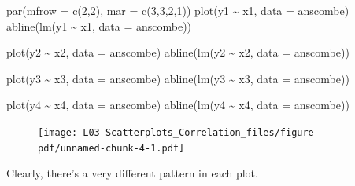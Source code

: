 \documentclass[
  letterpaper,
  DIV=11,
  numbers=noendperiod]{scrreprt}
\newenvironment{Shaded}{\begin{snugshade}}{\end{snugshade}}
\newcommand{\AttributeTok}[1]{\textcolor[rgb]{0.40,0.45,0.13}{#1}}
\newcommand{\DecValTok}[1]{\textcolor[rgb]{0.68,0.00,0.00}{#1}}
\newcommand{\FunctionTok}[1]{\textcolor[rgb]{0.28,0.35,0.67}{#1}}
\newcommand{\NormalTok}[1]{\textcolor[rgb]{0.00,0.23,0.31}{#1}}
\newcommand{\SpecialCharTok}[1]{\textcolor[rgb]{0.37,0.37,0.37}{#1}}
\begin{document}
\begin{Shaded}
\begin{Highlighting}[]
\FunctionTok{par}\NormalTok{(}\AttributeTok{mfrow =} \FunctionTok{c}\NormalTok{(}\DecValTok{2}\NormalTok{,}\DecValTok{2}\NormalTok{), }\AttributeTok{mar =} \FunctionTok{c}\NormalTok{(}\DecValTok{3}\NormalTok{,}\DecValTok{3}\NormalTok{,}\DecValTok{2}\NormalTok{,}\DecValTok{1}\NormalTok{))}
\FunctionTok{plot}\NormalTok{(y1 }\SpecialCharTok{\textasciitilde{}}\NormalTok{ x1, }\AttributeTok{data =}\NormalTok{ anscombe)}
\FunctionTok{abline}\NormalTok{(}\FunctionTok{lm}\NormalTok{(y1 }\SpecialCharTok{\textasciitilde{}}\NormalTok{ x1, }\AttributeTok{data =}\NormalTok{ anscombe))}

\FunctionTok{plot}\NormalTok{(y2 }\SpecialCharTok{\textasciitilde{}}\NormalTok{ x2, }\AttributeTok{data =}\NormalTok{ anscombe)}
\FunctionTok{abline}\NormalTok{(}\FunctionTok{lm}\NormalTok{(y2 }\SpecialCharTok{\textasciitilde{}}\NormalTok{ x2, }\AttributeTok{data =}\NormalTok{ anscombe))}

\FunctionTok{plot}\NormalTok{(y3 }\SpecialCharTok{\textasciitilde{}}\NormalTok{ x3, }\AttributeTok{data =}\NormalTok{ anscombe)}
\FunctionTok{abline}\NormalTok{(}\FunctionTok{lm}\NormalTok{(y3 }\SpecialCharTok{\textasciitilde{}}\NormalTok{ x3, }\AttributeTok{data =}\NormalTok{ anscombe))}

\FunctionTok{plot}\NormalTok{(y4 }\SpecialCharTok{\textasciitilde{}}\NormalTok{ x4, }\AttributeTok{data =}\NormalTok{ anscombe)}
\FunctionTok{abline}\NormalTok{(}\FunctionTok{lm}\NormalTok{(y4 }\SpecialCharTok{\textasciitilde{}}\NormalTok{ x4, }\AttributeTok{data =}\NormalTok{ anscombe))}
\end{Highlighting}
\end{Shaded}

\begin{figure}[H]

{\centering \texttt{[image: L03-Scatterplots\_Correlation\_files/figure-pdf/unnamed-chunk-4-1.pdf]}

}

\end{figure}

Clearly, there's a very different pattern in each plot.
\end{document}
